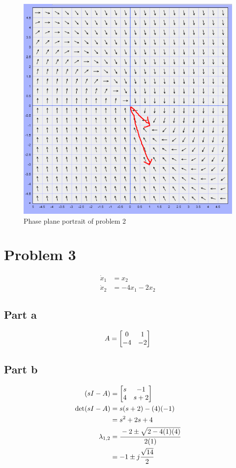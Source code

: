 \documentclass[]{article}
\begin{document}
\begin{figure}[p]
	\centering
	\includegraphics[width=0.7\linewidth]{fig/pblm2_w_vectors}
	\caption{Phase plane portrait of problem 2}
	\label{fig:pblm2}
\end{figure}


\newpage
\section{Problem 3}
\begin{align*}
	\dot{x}_1 &= x_2\\
	\dot{x}_2 &= -4 x_1 - 2 x_2
\end{align*}

\subsection{Part a}
\begin{displaymath}
	A = \mqty[0&1\\-4&-2]
\end{displaymath}

\subsection{Part b}

\begin{align*}
	(sI - A)
	&= \mqty[s & -1\\ 4 & s+2]\\
	\det(sI-A)
	&= s(s+2) - (4)(-1)\\
	&= s^2 + 2 s + 4\\
	\lambda_{1,2}
	&= \cfrac{-2 \pm \sqrt{2 - 4(1)(4)}}{2(1)}\\
	&= -1 \pm j\frac{\sqrt{14}}{2}
\end{align*}
\end{document}
